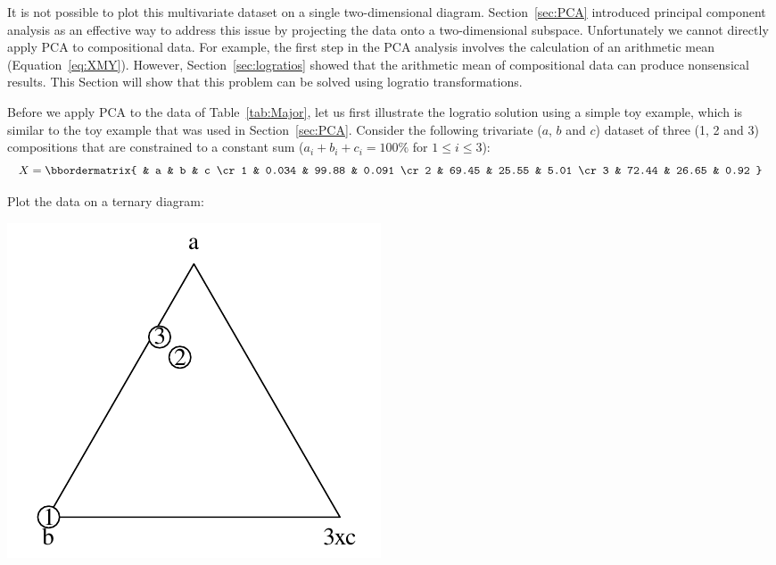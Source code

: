 It is not possible to plot this multivariate dataset on a single
two-dimensional diagram. Section~\ref{sec:PCA} introduced principal
component analysis as an effective way to address this issue by
projecting the data onto a two-dimensional subspace. Unfortunately we
cannot directly apply PCA to compositional data. For example, the
first step in the PCA analysis involves the calculation of an
arithmetic mean (Equation~\ref{eq:XMY}). However,
Section~\ref{sec:logratios} showed that the arithmetic mean of
compositional data can produce nonsensical results. This Section will
show that this problem can be solved using logratio
transformations.\medskip

Before we apply PCA to the data of Table~\ref{tab:Major}, let us first
illustrate the logratio solution using a simple toy example, which is
similar to the toy example that was used in
Section~\ref{sec:PCA}. Consider the following trivariate ($a$, $b$ and
$c$) dataset of three (1, 2 and 3) compositions that are constrained
to a constant sum ($a_i+b_i+c_i=100\%$ for $1\leq{i}\leq{3}$):
\begin{equation}
  X =
  \bbordermatrix{ & a & b & c \cr
   1 & 0.034 & 99.88 & 0.091 \cr
   2 & 69.45 & 25.55 & 5.01 \cr
   3 & 72.44 & 26.65 & 0.92
  }
  \label{eq:Xcomp}
\end{equation}

Plot the data on a ternary diagram:

\noindent\begin{minipage}[t][][b]{.3\textwidth}
\includegraphics[width=\textwidth]{../figures/abc.pdf}\medskip
\end{minipage}
\begin{minipage}[t][][t]{.7\textwidth}
  \label{fig:abc}
\end{minipage}

